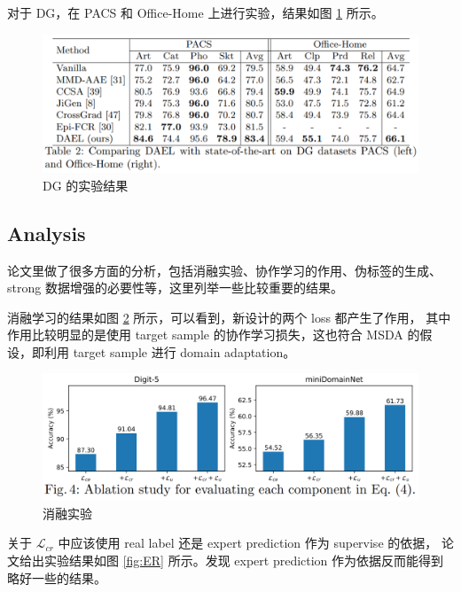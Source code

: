 \documentclass[UTF8]{ctexart}
\begin{document}
对于 DG，在 PACS 和 Office-Home 上进行实验，结果如图 \ref{fig:DG} 所示。

\begin{figure}[ht]
    \centering
    \includegraphics[scale=0.4]{20200927_Experiment_DG.png}
    \caption{DG 的实验结果}
    \label{fig:DG}
\end{figure}

\subsection{Analysis}

论文里做了很多方面的分析，包括消融实验、协作学习的作用、伪标签的生成、strong 数据增强的必要性等，这里列举一些比较重要的结果。

消融学习的结果如图 \ref{fig:Ablation} 所示，可以看到，新设计的两个 loss 都产生了作用，
其中作用比较明显的是使用 target sample 的协作学习损失，这也符合 MSDA 的假设，即利用 target sample 进行 domain adaptation。

\begin{figure}[ht]
    \centering
    \includegraphics[scale=0.35]{20200927_Ablation.png}
    \caption{消融实验}
    \label{fig:Ablation}
\end{figure}

关于 $\mathcal{L}_{cr}$ 中应该使用 real label 还是 expert prediction 作为 supervise 的依据，
论文给出实验结果如图 \ref{fig:ER} 所示。发现 expert prediction 作为依据反而能得到略好一些的结果。
\end{document}
